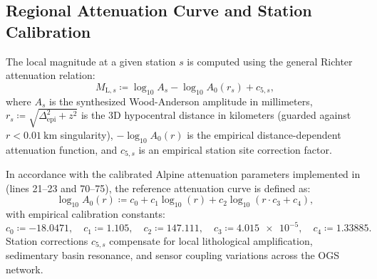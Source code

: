 \subsection{Regional Attenuation Curve and Station Calibration}
The local magnitude at a given station $s$ is computed using the
general Richter attenuation relation:
\begin{equation}
  M_{\mathrm{L}, s} \coloneqq \log_{10} A_s - \log_{10} A_0(r_s) + c_{5, s},
\end{equation}
where $A_s$ is the synthesized Wood-Anderson amplitude in
millimeters, $r_s \coloneqq \sqrt{\Delta_{\mathrm{epi}}^2 + z^2}$ is the 3D
hypocentral distance in kilometers (guarded against $r <
\qty{0.01}{\kilo\meter}$ singularity), $-\log_{10} A_0(r)$ is the
empirical distance-dependent attenuation function, and $c_{5, s}$ is
an empirical station site correction factor.

In accordance with the calibrated Alpine attenuation parameters
implemented in  (lines 21--23 and
70--75), the reference attenuation curve is defined as:
\begin{equation}
  \log_{10} A_0(r) \coloneqq c_0 + c_1 \log_{10}(r) + c_2
  \log_{10}(r \cdot c_3 + c_4),
  \label{eq:magnitude_attenuation}
\end{equation}
with empirical calibration constants:
\begin{equation}
  c_0 \coloneqq \num{-18.0471}, \quad c_1 \coloneqq \num{1.105},
  \quad c_2 \coloneqq \num{147.111}, \quad c_3
  \coloneqq \num{4.015e-5}, \quad c_4 \coloneqq \num{1.33885}.
\end{equation}
Station corrections $c_{5, s}$ compensate for local lithological
amplification, sedimentary basin resonance, and sensor coupling
variations across the \ac{OGS} network.

